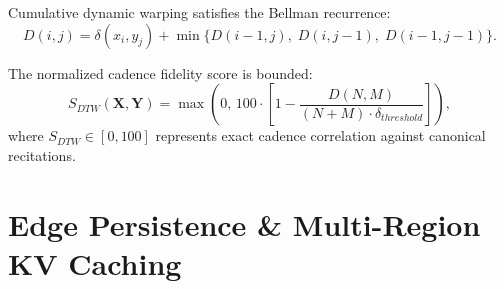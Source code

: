 \documentclass[11pt,a4paper,reqno]{article}
\def\mathrm#1{#1}%
\def\mathcal#1{#1}%
\theoremstyle{plain}
\theoremstyle{definition}
\theoremstyle{remark}
\numberwithin{equation}{section}
\begin{document}
Cumulative dynamic warping satisfies the Bellman recurrence:
\begin{equation}
\label{eq:dtw_recurrence}
\mathcal{D}(i, j) = \delta(x_i, y_j) + \min \big\{ \mathcal{D}(i-1, j), \; \mathcal{D}(i, j-1), \; \mathcal{D}(i-1, j-1) \big\}.
\end{equation}

The normalized cadence fidelity score is bounded:
\begin{equation}
\label{eq:cadence_score}
\mathcal{S}_{\mathrm{DTW}}(\mathbf{X}, \mathbf{Y}) = \max\left(0, \, 100 \cdot \left[1 - \frac{\mathcal{D}(N, M)}{(N + M) \cdot \delta_{\mathrm{threshold}}}\right]\right),
\end{equation}
where $\mathcal{S}_{\mathrm{DTW}} \in [0, 100]$ represents exact cadence correlation against canonical recitations.

\section{\texorpdfstring{Edge Persistence \& Multi-Region KV Caching}{Edge Persistence and Multi-Region KV Caching}}
\label{sec:persistence}
\end{document}
